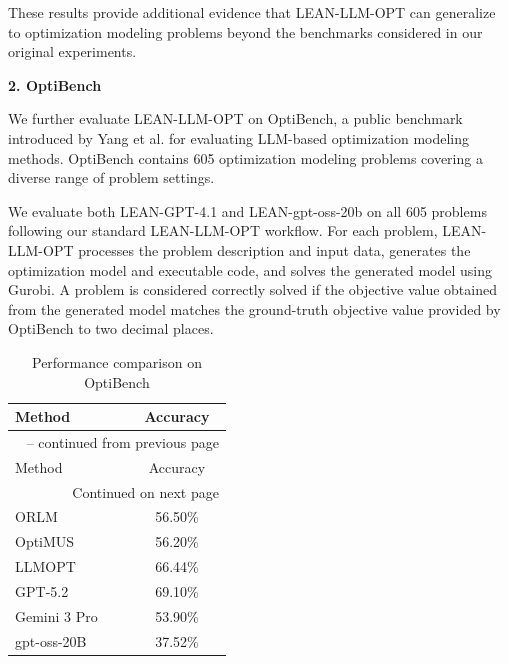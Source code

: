 \documentclass[11pt]{article}
\begin{document}
\begin{enumerate}[label=(AssoE.\arabic*),leftmargin=*]
\begin{enumerate}[label=(R2.Major.\arabic*),leftmargin=*]
These results provide additional evidence that LEAN-LLM-OPT can generalize to optimization modeling problems beyond the benchmarks considered in our original experiments.

\medskip
\noindent
\textbf{2. OptiBench}

We further evaluate LEAN-LLM-OPT on OptiBench, a public benchmark introduced by Yang et al. \citep{yang2025optibench} for evaluating LLM-based optimization modeling methods. OptiBench contains 605 optimization modeling problems covering a diverse range of problem settings.

We evaluate both LEAN-GPT-4.1 and LEAN-gpt-oss-20b on all 605 problems following our standard LEAN-LLM-OPT workflow. For each problem, LEAN-LLM-OPT processes the problem description and input data, generates the optimization model and executable code, and solves the generated model using Gurobi. A problem is considered correctly solved if the objective value obtained from the generated model matches the ground-truth objective value provided by OptiBench to two decimal places.


\begin{longtable}{lc}
\caption{Performance comparison on OptiBench}
\label{tab:optibench_results} \\

\toprule
Method & Accuracy \\
\midrule
\endfirsthead

\multicolumn{2}{c}{
\tablename\ \thetable{} -- continued from previous page
} \\
\toprule
Method & Accuracy \\
\midrule
\endhead

\midrule
\multicolumn{2}{r}{Continued on next page} \\
\endfoot

\bottomrule
\endlastfoot

ORLM \citep{ding2026or}
& 56.50\% \\

OptiMUS \citep{zhang2026dual}
& 56.20\% \\

LLMOPT \citep{shu2025llmopt}
& 66.44\% \\

GPT-5.2 \citep{shen2026proopf}
& 69.10\% \\

Gemini 3 Pro \citep{shen2026proopf}
& 53.90\% \\

gpt-oss-20B \citep{team2025every}
& 37.52\% \\


\end{longtable}
\end{enumerate}
\end{enumerate}
\end{document}
